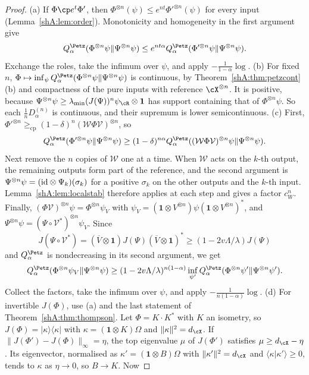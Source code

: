 \begin{proof}
(a) If $\Phi\cp e^t\Phi'$, then $\Phi^{\otimes n}(\psi)\le e^{nt}\Phi'^{\otimes n}(\psi)$ for every input (Lemma~\ref{shA:lem:order}). Monotonicity and homogeneity in the first argument give
\[
Q^\Petz_\alpha(\Phi^{\otimes n}\psi\|\Psi^{\otimes n}\psi)\le e^{nt\alpha}Q^\Petz_\alpha(\Phi'^{\otimes n}\psi\|\Psi^{\otimes n}\psi).
\]
Exchange the roles, take the infimum over $\psi$, and apply $-\frac1{1-\alpha}\log$.
(b) For fixed $n$, $\Phi\mapsto\inf_\psi Q^\Petz_\alpha(\Phi^{\otimes n}\psi\|\Psi^{\otimes n}\psi)$ is continuous, by Theorem~\ref{shA:thm:petzcont}(b) and compactness of the pure inputs with reference $\cX^{\otimes n}$. It is positive, because $\Psi^{\otimes n}\psi\ge\lambda_{\min}(J(\Psi))^n\psi_\cR\otimes\mathbf 1$ has support containing that of $\Phi^{\otimes n}\psi$. So each $\frac1nD^{(n)}_\alpha$ is continuous, and their supremum is lower semicontinuous.
(c) First, $\Phi'^{\otimes n}\ge_{\mathrm{cp}}(1-\delta)^n(\mathcal W\Phi\mathcal V)^{\otimes n}$, so
\[
Q^\Petz_\alpha(\Phi'^{\otimes n}\psi\|\Psi^{\otimes n}\psi)\ge(1-\delta)^{n\alpha}Q^\Petz_\alpha((\mathcal W\Phi\mathcal V)^{\otimes n}\psi\|\Psi^{\otimes n}\psi).
\]
Next remove the $n$ copies of $\mathcal W$ one at a time. When $\mathcal W$ acts on the $k$-th output, the remaining outputs form part of the reference, and the second argument is $\Psi^{\otimes n}\psi=(\mathrm{id}\otimes\Psi_k)(\sigma_k)$ for a positive $\sigma_k$ on the other outputs and the $k$-th input. Lemma~\ref{shA:lem:localstab} therefore applies at each step and gives a factor $c_W^n$. Finally, $(\Phi\mathcal V)^{\otimes n}\psi=\Phi^{\otimes n}\psi_V$ with $\psi_V=(\mathbf 1\otimes V^{\otimes n})\psi(\mathbf 1\otimes V^{\otimes n})^*$, and $\Psi^{\otimes n}\psi=(\Psi\circ\mathcal V^*)^{\otimes n}\psi_V$. Since
\[
J(\Psi\circ\mathcal V^*)=(\overline V\otimes\mathbf 1)J(\Psi)(\overline V\otimes\mathbf 1)^*\ge(1-2v\Lambda/\lambda)J(\Psi)
\]
and $Q^\Petz_\alpha$ is nondecreasing in its second argument, we get
\[
Q^\Petz_\alpha(\Phi^{\otimes n}\psi_V\|\Psi^{\otimes n}\psi)\ge(1-2v\Lambda/\lambda)^{n(1-\alpha)}\inf_{\psi'}Q^\Petz_\alpha(\Phi^{\otimes n}\psi'\|\Psi^{\otimes n}\psi').
\]
Collect the factors, take the infimum over $\psi$, and apply $-\frac1{n(1-\alpha)}\log$.
(d) For invertible $J(\Phi)$, use (a) and the last statement of Theorem~\ref{shA:thm:thompson}. Let $\Phi=K\cdot K^*$ with $K$ an isometry, so $J(\Phi)=|\kappa\rangle\langle\kappa|$ with $\kappa=(\mathbf 1\otimes K)\Omega$ and $\|\kappa\|^2=d_\cX$. If $\|J(\Phi')-J(\Phi)\|_\infty=\eta$, the top eigenvalue $\mu$ of $J(\Phi')$ satisfies $\mu\ge d_\cX-\eta$. Its eigenvector, normalised as $\kappa'=(\mathbf 1\otimes B)\Omega$ with $\|\kappa'\|^2=d_\cX$ and $\langle\kappa|\kappa'\rangle\ge0$, tends to $\kappa$ as $\eta\to0$, so $B\to K$. Now

\end{proof}
